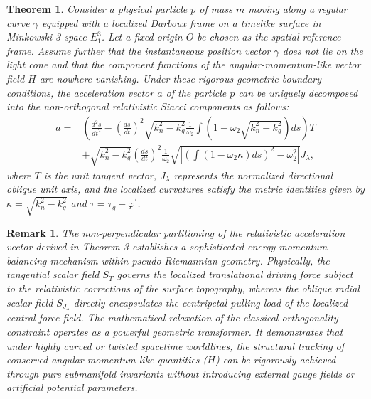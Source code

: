 \documentclass[reqno]{amsart}
\newtheorem{theorem}{Theorem}
\theoremstyle{plain}
\newtheorem{remark}{Remark}
\numberwithin{equation}{section}
\begin{document}
\begin{theorem} 
Consider a physical particle $p$ of mass $m$ moving along a regular curve $\gamma$ equipped with a localized Darboux frame on a timelike surface in Minkowski 3-space $E_1^3$. Let a fixed origin $O$ be chosen as the spatial reference frame. Assume further that the instantaneous position vector $\gamma$ does not lie on the light cone and that the component functions of the angular-momentum-like vector field $H$ are nowhere vanishing. Under these rigorous geometric boundary conditions, the acceleration vector $a$ of the particle $p$ can be uniquely decomposed into the non-orthogonal relativistic Siacci components as follows:
\begin{align}
a = {} & \left( \frac{d^{2}s}{dt^{2}} - \left( \frac{ds}{dt}\right)^{2}\sqrt{k_{n}^{2}-k_{g}^{2}}\frac{1}{\omega _{2}}\int \left( 1 - \omega _{2}\sqrt{k_{n}^{2}-k_{g}^{2}}\right) ds\right) T \nonumber \\
& + \sqrt{k_{n}^{2}-k_{g}^{2}}\left( \frac{ds}{dt}\right)^{2}\frac{1}{\omega _{2}}\sqrt{\left| \left( \int \left( 1 - \omega _{2}\kappa \right) ds\right)^{2} - \omega _{2}^{2} \right|} J_{\lambda }, \tag{3.39}
\end{align}
where $T$ is the unit tangent vector, $J_{\lambda}$ represents the normalized directional oblique unit axis, and the localized curvatures satisfy the metric identities given by $\kappa = \sqrt{k_{n}^{2}-k_{g}^{2}}$ and $\tau = \tau_{g}+\varphi^{\prime}$.
\end{theorem}





\begin{remark} 
The non-perpendicular partitioning of the relativistic acceleration vector derived in Theorem 3 establishes a sophisticated energy momentum balancing mechanism within pseudo-Riemannian geometry. Physically, the tangential scalar field $S_T$ governs the localized translational driving force subject to the relativistic corrections of the surface topography, whereas the oblique radial scalar field $S_{J_\lambda}$ directly encapsulates the centripetal pulling load of the localized central force field. The mathematical relaxation of the classical orthogonality constraint operates as a powerful geometric transformer. It demonstrates that under highly curved or twisted spacetime worldlines, the structural tracking of conserved angular momentum like quantities ($H$) can be rigorously achieved through pure submanifold invariants without introducing external gauge fields or artificial potential parameters.
\end{remark}
\end{document}
